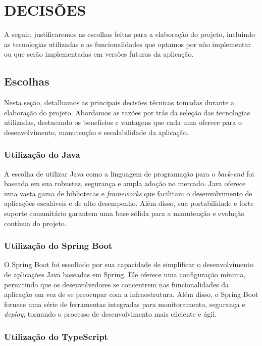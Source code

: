 \chapter{DECISÕES}
\label{escolhas-descartes}
A seguir, justificaremos as escolhas feitas para a elaboração do projeto, incluindo as tecnologias utilizadas e as funcionalidades que optamos por não implementar ou que serão implementadas em versões futuras da aplicação.

\section{Escolhas}

Nesta seção, detalhamos as principais decisões técnicas tomadas durante a elaboração do projeto. Abordamos as razões por trás da seleção das tecnologias utilizadas, destacando os benefícios e vantagens que cada uma oferece para o desenvolvimento, manutenção e escalabilidade da aplicação.

\subsection{Utilização do Java}

A escolha de utilizar Java como a linguagem de programação para o \textit{back-end} foi baseada em sua robustez, segurança e ampla adoção no mercado. Java oferece uma vasta gama de bibliotecas e \textit{frameworks} que facilitam o desenvolvimento de aplicações escaláveis e de alto desempenho. Além disso, sua portabilidade e forte suporte comunitário garantem uma base sólida para a manutenção e evolução contínua do projeto.

\subsection{Utilização do Spring Boot}

O Spring Boot foi escolhido por sua capacidade de simplificar o desenvolvimento de aplicações Java baseadas em Spring. Ele oferece uma configuração mínima, permitindo que os desenvolvedores se concentrem nas funcionalidades da aplicação em vez de se preocupar com a infraestrutura. Além disso, o Spring Boot fornece uma série de ferramentas integradas para monitoramento, segurança e \textit{deploy}, tornando o processo de desenvolvimento mais eficiente e ágil.

\subsection{Utilização do TypeScript}

